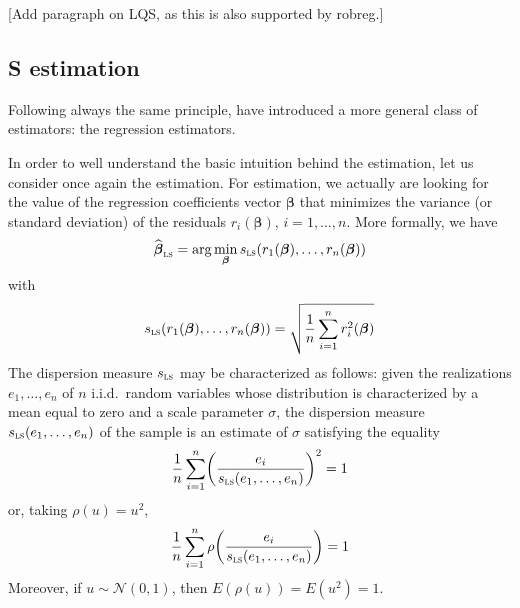 \alert{[Add paragraph on LQS, as this is also supported by robreg.]}

\subsection{S estimation}

Following always the same principle, \citet{rousseeuw:yohai:1984} have
introduced a more general class of estimators: the regression
 estimators.

In order to well understand the basic intuition behind the  estimation,
let us consider once again the  estimation. For  estimation,
we actually are looking for the value of the regression coefficients vector
$\boldsymbol{\beta}$ that minimizes the variance (or standard deviation) of the
residuals $r_{i}(\boldsymbol\beta)$, $i = 1, \dots, n$. More formally, we have
\[
    \sthat{\boldsymbol\beta}_{\stsc{LS}} 
    = \arg\min_{\boldsymbol\beta} s_{\stsc{LS}}(r_{1}(\boldsymbol\beta), \dots, r_{n}(\boldsymbol\beta))
\]
with
\[
    s_{\stsc{LS}}(r_{1}(\boldsymbol\beta), \dots, r_{n}(\boldsymbol\beta)) 
    = \sqrt{\frac{1}{n}\sum_{i=1}^{n} r_{i}^{2}(\boldsymbol\beta)}
\]
The dispersion measure $s_{\stsc{LS}}$ may be characterized as follows: given
the realizations $e_{1}, \dots, e_{n}$ of $n$ i.i.d.\ random variables whose
distribution is characterized by a mean equal to zero and a scale parameter
$\sigma$, the dispersion measure $s_{\stsc{LS}}(e_{1}, \dots, e_{n})$ of the
sample is an estimate of $\sigma$ satisfying the equality
\[
    \frac{1}{n}\sum_{i=1}^{n} \left(\frac{e_{i}}{s_{\stsc{LS}}(e_{1}, \dots, e_{n})}\right)^{2} = 1
\]
or, taking $\rho(u) = u^{2}$,
\[
    \frac{1}{n}\sum_{i=1}^{n} \rho\left(\frac{e_{i}}{s_{\stsc{LS}}(e_{1}, \dots, e_{n})}\right) = 1
\]
Moreover, if $u \sim \mathcal{N}(0,1)$, then $E(\rho(u)) = E(u^{2}) = 1$.

